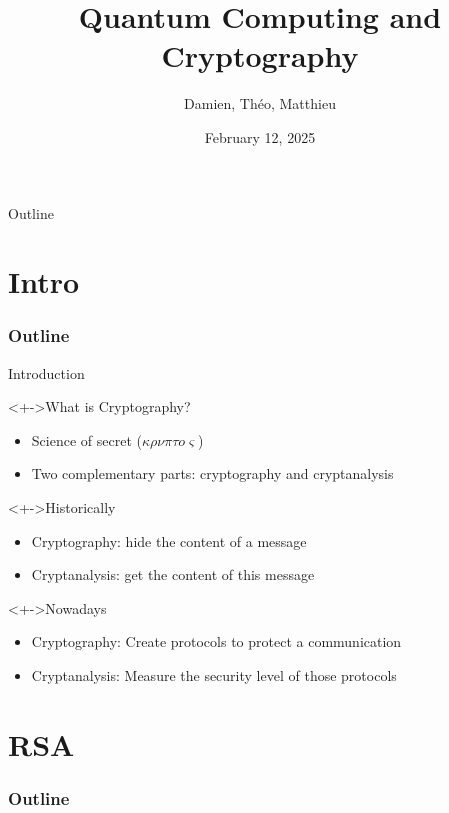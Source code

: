 \documentclass{beamer}
\title{Quantum Computing and Cryptography}
\author{Damien, Théo, Matthieu}
\institute{}
\date{February 12, 2025}
\begin{document}
\begin{frame}
\maketitle
\end{frame}

\begin{frame}{Outline}
\tableofcontents
\end{frame}

\section{Intro}
\begin{frame}
  \frametitle{Outline}
  \tableofcontents[currentsection]
\end{frame}

\begin{frame}{Introduction}
\begin{linenumbers}
	\begin{block}<+->{What is Cryptography?}
		\begin{itemize}
			\item Science of secret ($\kappa\rho\nu\pi\tau o\varsigma$) %
			\item Two complementary parts: cryptography and cryptanalysis
		\end{itemize}
	\end{block}
	\begin{block}<+->{Historically}
		\begin{itemize}
			\item Cryptography: hide the content of a message
			\item Cryptanalysis: get the content of this message
		\end{itemize}
	\end{block}
	\begin{block}<+->{Nowadays}
		\begin{itemize}
			\item Cryptography: Create protocols to protect a communication
			\item Cryptanalysis: Measure the security level of those protocols
		\end{itemize}
	\end{block}
\end{linenumbers}
\end{frame}

\section{RSA}
\begin{frame}
  \frametitle{Outline}
  \tableofcontents[currentsection]
\end{frame}
\end{document}
